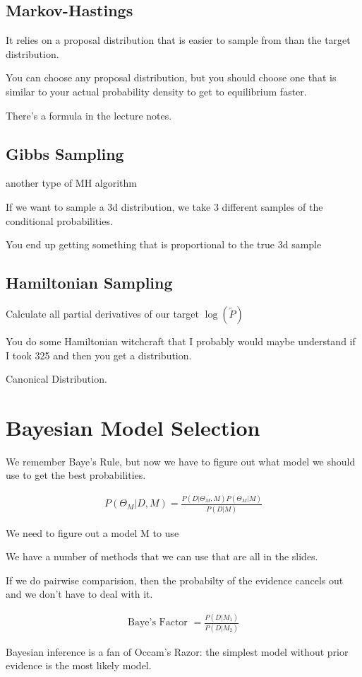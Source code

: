 \documentclass[fleqn]{report}
\newcommand{\equations} [1] {
\begin{gather*}
#1
\end{gather*}
}
\begin{document}
\subsection{Markov-Hastings}
It relies on a proposal distribution that is easier to 
sample from than the target distribution.

You can choose any proposal distribution, but you should choose one 
that is similar to your actual probability density to get to equilibrium 
faster. 

There's a formula in the lecture notes. 

\subsection{Gibbs Sampling}
another type of MH algorithm 

If we want to sample a 3d distribution, we take 3 different samples of 
the conditional probabilities. 

You end up getting something that is proportional to the true 3d sample 

\subsection{Hamiltonian Sampling}
Calculate all partial derivatives of our target $\log(\tilde{P})$

You do some Hamiltonian witchcraft that I probably would maybe understand 
if I took 325 and then you get a distribution. 

Canonical Distribution. 

\section{Bayesian Model Selection}
We remember Baye's Rule, but now we have to figure out what model 
we should use to get the best probabilities. 

\equations{
    P(\Theta_M | D, M)
    =
    \frac{ P(D | \Theta_M, M) P(\Theta_M | M) } { P(D | M) } 
}
We need to figure out a model M to use 

We have a number of methods that we can use that are all in the slides. 

If we do pairwise comparision, then the probabilty of the evidence 
cancels out and we don't have to deal with it. 

\equations{
    \textrm{Baye's Factor }
    =
    \frac{P(D | M_1)}
    {P(D | M_2)}
}

Bayesian inference is a fan of Occam's Razor: the simplest model 
without prior evidence is the most likely model. 
\end{document}
